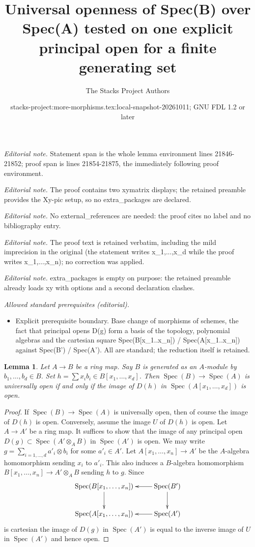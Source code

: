 \documentclass[10pt,a4paper]{amsart}
\title{Universal openness of Spec(B) over Spec(A) tested on one explicit principal open for a finite generating set}
\author{The Stacks Project Authors}
\date{stacks-project:more-morphisms.tex:local-snapshot-20261011; GNU FDL 1.2 or later}
\theoremstyle{plain}
\newtheorem{lemma}[subsection]{Lemma}
\theoremstyle{definition}
\theoremstyle{remark}
\numberwithin{equation}{subsection}
\def\Spec{\mathop{\mathrm{Spec}}}
\begin{document}
\maketitle
\noindent\textit{Editorial note.} Statement span is the whole lemma environment lines 21846-21852; proof span is lines 21854-21875, the immediately following proof environment.\par\medskip
\noindent\textit{Editorial note.} The proof contains two xymatrix displays; the retained preamble provides the Xy-pic setup, so no extra\_packages are declared.\par\medskip
\noindent\textit{Editorial note.} No external\_references are needed: the proof cites no label and no bibliography entry.\par\medskip
\noindent\textit{Editorial note.} The proof text is retained verbatim, including the mild imprecision in the original (the statement writes x\_1,...,x\_d while the proof writes x\_1,...,x\_n); no correction was applied.\par\medskip
\noindent\textit{Editorial note.} extra\_packages is empty on purpose: the retained preamble already loads xy with options and a second declaration clashes.\par\medskip
\noindent\textit{Allowed standard prerequisites (editorial).}\begin{itemize}
\item Explicit prerequisite boundary. Base change of morphisms of schemes, the fact that principal opens D(g) form a basis of the topology, polynomial algebras and the cartesian square Spec(B[x\_1..x\_n]) / Spec(A[x\_1..x\_n]) against Spec(B') / Spec(A'). All are standard; the reduction itself is retained.
\end{itemize}\medskip
\begin{lemma}
\label{lemma-characterize-universally-open-finite}
Let $A \to B$ be a ring map. Say $B$ is generated as an $A$-module by
$b_1, \ldots, b_d \in B$. Set $h = \sum x_ib_i \in B[x_1, \ldots, x_d]$.
Then $\Spec(B) \to \Spec(A)$ is universally open if and only if the image of
$D(h)$ in $\Spec(A[x_1, \ldots, x_d])$ is open.
\end{lemma}

\begin{proof}
If $\Spec(B) \to \Spec(A)$ is universally open, then of course
the image of $D(h)$ is open. Conversely, assume the image $U$ of
$D(h)$ is open. Let $A \to A'$ be a ring map. It suffices to show
that the image of any principal open $D(g) \subset \Spec(A' \otimes_A B)$
in $\Spec(A')$ is open. We may write
$g = \sum_{i = 1, \ldots, d} a'_i \otimes b_i$ for some $a'_i \in A'$.
Let $A[x_1, \ldots, x_n] \to A'$ be the $A$-algebra homomorphism
sending $x_i$ to $a'_i$. This also induces a $B$-algebra
homomorphism $B[x_1, \ldots, x_n] \to A' \otimes_A B$ sending $h$ to $g$.
Since
$$
\xymatrix{
\Spec(B[x_1, \ldots, x_n]) \ar[d] &
\Spec(B') \ar[l] \ar[d] \\
\Spec(A[x_1, \ldots, x_n]) &
\Spec(A') \ar[l]
}
$$
is cartesian the image of $D(g)$ in $\Spec(A')$ is equal to the
inverse image of $U$ in $\Spec(A')$ and hence open.
\end{proof}
\end{document}
